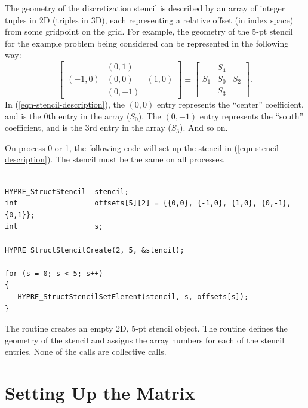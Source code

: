 The geometry of the discretization stencil is described by an array of
integer tuples in 2D (triples in 3D), each representing a relative
offset (in index space) from some gridpoint on the grid.  For example,
the geometry of the 5-pt stencil for the example problem being
considered can be represented in the following way:
\begin{equation}\label{eqn-stencil-description}
\left [
\begin{array}{ccc}
        & ( 0, 1) &         \\
(-1, 0) & ( 0, 0) & ( 1, 0) \\
        & ( 0,-1) &        
\end{array}
\right ]
\equiv
\left [
\begin{array}{ccc}
    & S_4 &     \\
S_1 & S_0 & S_2 \\
    & S_3 &    
\end{array}
\right ] .
\end{equation}
In (\ref{eqn-stencil-description}), the $(0,0)$ entry represents the
``center'' coefficient, and is the 0th entry in the array ($S_0$).
The $(0,-1)$ entry represents the ``south'' coefficient, and is the
3rd entry in the array ($S_3$).  And so on.

On process 0 or 1, the following code will set up the stencil in
(\ref{eqn-stencil-description}).  The stencil must be the same on all
processes.
\begin{display}
\begin{verbatim}

HYPRE_StructStencil  stencil;
int                  offsets[5][2] = {{0,0}, {-1,0}, {1,0}, {0,-1}, {0,1}};
int                  s;

HYPRE_StructStencilCreate(2, 5, &stencil);

for (s = 0; s < 5; s++)
{
   HYPRE_StructStencilSetElement(stencil, s, offsets[s]);
}

\end{verbatim}
\end{display}
The  routine creates an empty 2D,
5-pt stencil object.  The 
routine defines the geometry of the stencil and assigns the array
numbers for each of the stencil entries.  None of the calls are
collective calls.


\section{Setting Up the Matrix}
\label{Setting Up the Matrix}


